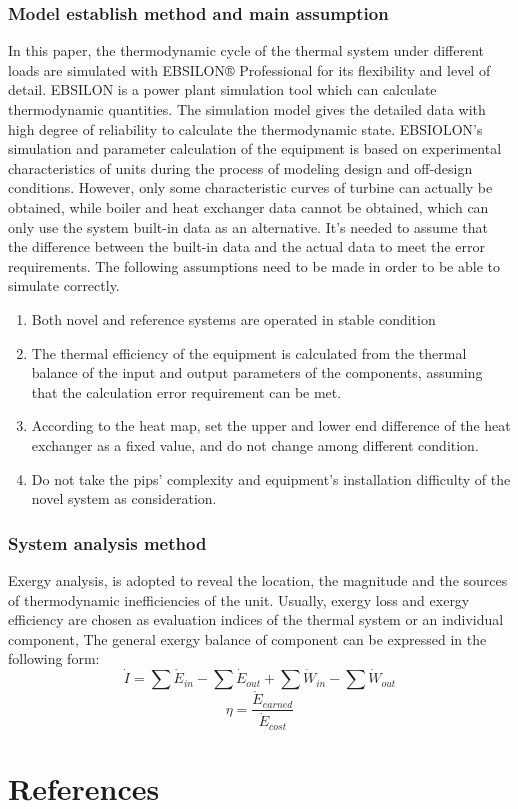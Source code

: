 \documentclass[preprint,12pt]{elsarticle}
\begin{document}
\subsubsection{Model establish method and main assumption}
\label{ssub3:modle description}
In this paper, the thermodynamic cycle of the thermal system under different loads are simulated with EBSILON® Professional for its flexibility and level of detail. 
EBSILON is a power plant simulation tool which can calculate thermodynamic quantities. 
The simulation model gives the detailed data with high degree of reliability to calculate the thermodynamic state.
EBSIOLON's simulation and parameter calculation of the equipment is based on experimental characteristics of units during the process of modeling design and off-design conditions.
However, only some characteristic curves of turbine can actually be obtained, while boiler and heat exchanger data cannot be obtained, which can only use the system built-in data as an alternative.
It’s needed to assume that the difference between the built-in data and the actual data to meet the error requirements.
The following assumptions need to be made in order to be able to simulate correctly.
\begin{enumerate}[(1)]
\item Both novel and reference systems are operated in stable condition
\item The thermal efficiency of the equipment is calculated from the thermal balance of the input and output parameters of the components, assuming that the calculation error requirement can be met.
\item According to the heat map, set the upper and lower end difference of the heat exchanger as a fixed value, and do not change among different condition.
\item  Do not take the pips' complexity and equipment’s installation difficulty of the novel system as consideration.
\end{enumerate}




\subsubsection{System analysis method} %
\label{ssub3:analsys method} 
Exergy analysis, is adopted to reveal the location, the magnitude and the sources of thermodynamic inefficiencies of the unit.
Usually, exergy loss and exergy efficiency are chosen as evaluation indices of the thermal system or an individual component, 
The general exergy balance of component can be expressed in the following form:
\begin{equation}
\dot{I}=\sum\dot{E}{}_{in}-\sum\dot{E}{}_{out}+\sum\dot{W}{}_{in}-\sum\dot{W}{}_{out}
\end{equation}
\begin{equation}
\eta=\frac{\dot{E}{}_{earned}}{\dot{E}{}_{cost}}
\end{equation}




\section*{References}



\end{document}
